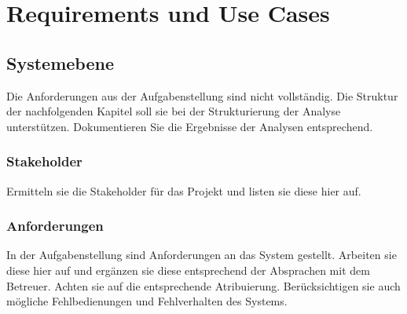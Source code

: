 \chapter{Requirements und Use Cases}

\section{Systemebene}

Die Anforderungen aus der Aufgabenstellung sind nicht vollständig. Die
Struktur der nachfolgenden Kapitel soll sie bei der Strukturierung der
Analyse unterstützen. Dokumentieren Sie die Ergebnisse der Analysen
entsprechend.

\subsection{Stakeholder}

Ermitteln sie die Stakeholder für das Projekt und listen sie diese hier
auf.

\subsection{Anforderungen}

In der Aufgabenstellung sind Anforderungen an das System gestellt.
Arbeiten sie diese hier auf und ergänzen sie diese entsprechend der
Absprachen mit dem Betreuer. Achten sie auf die entsprechende
Atribuierung. 
Berücksichtigen sie auch mögliche Fehlbedienungen und Fehlverhalten des
Systems.

